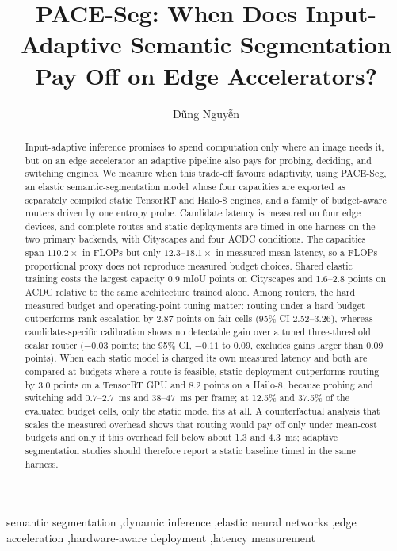\documentclass[a4paper,5p]{elsarticle}
\newcommand{\method}{PACE-Seg}
\newcommand{\miou}{mIoU}
\begin{document}
\begin{frontmatter}

\title{PACE-Seg: When Does Input-Adaptive Semantic Segmentation Pay Off on Edge Accelerators?}

\author[aff1]{D\~ung Nguy\~{\^e}n}

\begin{abstract}
Input-adaptive inference promises to spend computation only where an image needs it, but on an edge accelerator an adaptive pipeline also pays for probing, deciding, and switching engines. We measure when this trade-off favours adaptivity, using \method{}, an elastic semantic-segmentation model whose four capacities are exported as separately compiled static TensorRT and Hailo-8 engines, and a family of budget-aware routers driven by one entropy probe. Candidate latency is measured on four edge devices, and complete routes and static deployments are timed in one harness on the two primary backends, with Cityscapes and four ACDC conditions. The capacities span $110.2\times$ in FLOPs but only $12.3$--$18.1\times$ in measured mean latency, so a FLOPs-proportional proxy does not reproduce measured budget choices. Shared elastic training costs the largest capacity 0.9 \miou{} points on Cityscapes and 1.6--2.8 points on ACDC relative to the same architecture trained alone. Among routers, the hard measured budget and operating-point tuning matter: routing under a hard budget outperforms rank escalation by 2.87 points on fair cells (95\% CI 2.52--3.26), whereas candidate-specific calibration shows no detectable gain over a tuned three-threshold scalar router ($-0.03$ points; the 95\% CI, $-0.11$ to $0.09$, excludes gains larger than 0.09 points). When each static model is charged its own measured latency and both are compared at budgets where a route is feasible, static deployment outperforms routing by 3.0 points on a TensorRT GPU and 8.2 points on a Hailo-8, because probing and switching add 0.7--2.7~ms and 38--47~ms per frame; at 12.5\% and 37.5\% of the evaluated budget cells, only the static model fits at all. A counterfactual analysis that scales the measured overhead shows that routing would pay off only under mean-cost budgets and only if this overhead fell below about 1.3 and 4.3~ms; adaptive segmentation studies should therefore report a static baseline timed in the same harness.
\end{abstract}

\begin{keyword}
semantic segmentation \sep dynamic inference \sep elastic neural networks \sep edge acceleration \sep hardware-aware deployment \sep latency measurement
\end{keyword}

\end{frontmatter}
\end{document}
